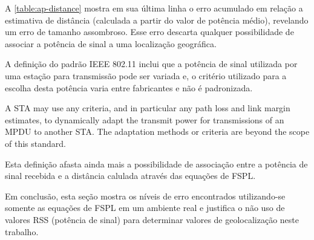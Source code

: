 A \autoref{table:ap-distance} mostra em sua última linha o erro acumulado
em relação a estimativa de distância (calculada a partir do valor de
potência médio), revelando um erro de tamanho assombroso.
Esse erro descarta qualquer possibilidade de associar a potência de sinal a uma
localização geográfica.

A definição do padrão IEEE 802.11 inclui que a potência de sinal
utilizada por uma estação para transmissão pode ser variada e, o critério utilizado
para a escolha desta potência varia entre fabricantes e não é padronizada.

\begin{citacao}[english]

	A STA may use any criteria, and in particular any path loss and link margin
	estimates, to dynamically adapt the transmit power for transmissions of an
	MPDU to another STA. The adaptation methods or criteria are beyond the scope
	of this standard. \

\end{citacao}

Esta definição afasta ainda mais a possibilidade de associação entre a potência
de sinal recebida e a distância calulada através das equações de FSPL.

Em conclusão, esta seção mostra os níveis de erro encontrados
utilizando-se somente as equações de FSPL em um ambiente real e justifica o não
uso de valores RSS (potência de sinal) para determinar valores de geolocalização neste trabalho.
